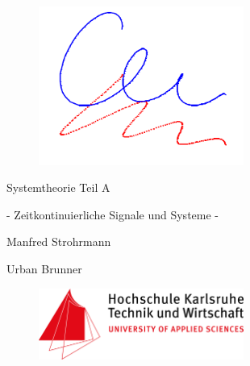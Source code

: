 \begin{figure}[H]
  \centerline{\includegraphics[width=0.6\textwidth]{Syslogo.PNG}}
\end{figure}

\noindent \bigskip

\centerline  {\fontsize{50}{60}\selectfont Systemtheorie Teil A} 

\noindent \medskip

\centerline  {\fontsize{23}{30}\selectfont  - Zeitkontinuierliche Signale und Systeme -}

\noindent \bigskip
\noindent \bigskip

\centerline  {\fontsize{23}{30}\selectfont  Manfred Strohrmann}\medskip

\noindent 

\centerline  {\fontsize{23}{30}\selectfont Urban Brunner}
\vspace{6.0\baselineskip}

\begin{figure}[H]
  \centerline{\includegraphics[width=0.6\textwidth]{FH_Logo.png}}
\end{figure}

\clearpage

\noindent

